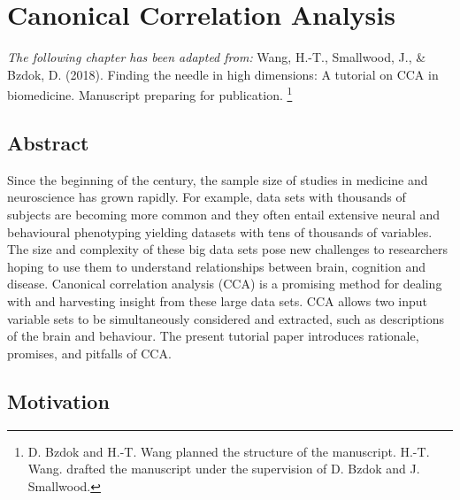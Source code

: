 \chapter{Canonical Correlation Analysis}
\label{ch:methods}


\textit{The following chapter has been adapted from:}
Wang, H.-T., Smallwood, J., \& Bzdok, D. (2018). Finding the needle in high dimensions: A tutorial on CCA in biomedicine. Manuscript preparing for publication.
\footnote{D. Bzdok and H.-T. Wang planned the structure of the manuscript.  H.-T. Wang. drafted the manuscript under the supervision of D. Bzdok and J. Smallwood.}
\section{Abstract}

Since the beginning of the  century, the sample size of studies in medicine and neuroscience has grown rapidly. For example, data sets with thousands of subjects are becoming more common and they often entail extensive neural and behavioural phenotyping yielding datasets with tens of thousands of variables. The size and complexity of these big data sets pose new challenges to researchers hoping to use them to understand relationships between brain, cognition and disease. Canonical correlation analysis (CCA) is a promising method for dealing with and harvesting insight from these large data sets. CCA allows two input variable sets to be simultaneously considered and extracted, such as descriptions of the brain and behaviour. The present tutorial paper introduces rationale, promises, and pitfalls of CCA.


\section{Motivation}
\label{ch:methods:motivation}


